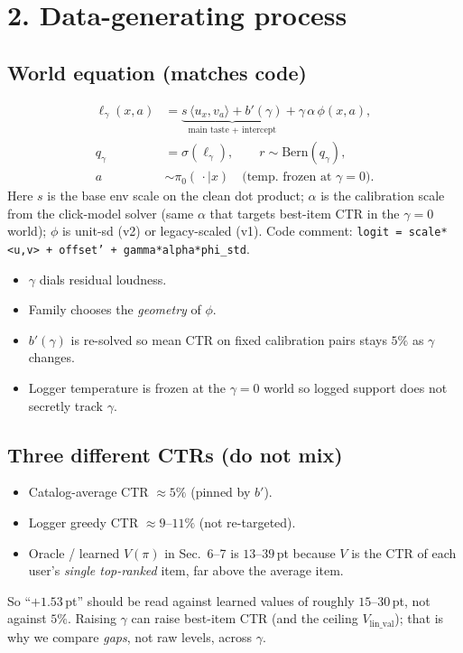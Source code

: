 \documentclass[11pt]{article}
\newcommand{\phonesection}[1]{\Needspace{8\baselineskip}\section*{#1}}
\newcommand{\phonesub}[1]{\Needspace{6\baselineskip}\subsection*{#1}}
\begin{document}
\phonesection{2. Data-generating process}

\phonesub{World equation (matches code)}
\begin{align*}
\ell_{\gamma}(x,a)
  &= \underbrace{s\,\langle u_x, v_a\rangle
     + b'(\gamma)}_{\text{main taste + intercept}}
     + \gamma\,\alpha\,\phi(x,a),\\
q_{\gamma}
  &= \sigma(\ell_{\gamma}),\qquad
r\sim\mathrm{Bern}(q_{\gamma}),\\
a &\sim \pi_0(\,\cdot\mid x)
  \quad\text{(temp.\ frozen at $\gamma{=}0$)}.
\end{align*}
Here $s$ is the base env scale on the clean
dot product; $\alpha$ is the calibration
scale from the click-model solver (same
$\alpha$ that targets best-item CTR in the
$\gamma{=}0$ world); $\phi$ is unit-sd (v2)
or legacy-scaled (v1).  Code comment:
\texttt{logit = scale*<u,v> + offset'
+ gamma*alpha*phi\_std}.

\begin{itemize}
  \item $\gamma$ dials residual loudness.
  \item Family chooses the \emph{geometry}
        of $\phi$.
  \item $b'(\gamma)$ is re-solved so mean
        CTR on fixed calibration pairs stays
        $5\%$ as $\gamma$ changes.
  \item Logger temperature is frozen at the
        $\gamma{=}0$ world so logged support
        does not secretly track $\gamma$.
\end{itemize}

\phonesub{Three different CTRs (do not mix)}
\begin{itemize}
  \item Catalog-average CTR $\approx 5\%$
        (pinned by $b'$).
  \item Logger greedy CTR $\approx 9$--$11\%$
        (not re-targeted).
  \item Oracle / learned $V(\pi)$ in
        Sec.~6--7 is $13$--$39$\,pt because
        $V$ is the CTR of each user's
        \emph{single top-ranked} item, far
        above the average item.
\end{itemize}
So ``$+1.53$\,pt'' should be read against
learned values of roughly $15$--$30$\,pt,
not against $5\%$.  Raising $\gamma$ can raise
best-item CTR (and the ceiling
$V_{\mathrm{lin\_val}}$); that is why we
compare \emph{gaps}, not raw levels, across
$\gamma$.
\end{document}
